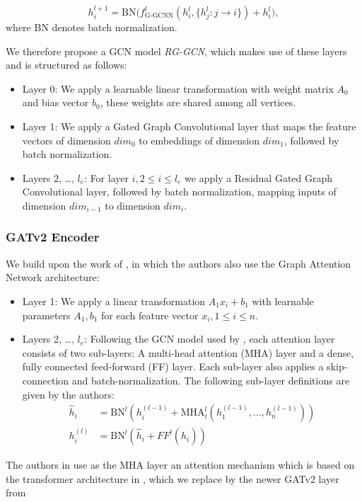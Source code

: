 \documentclass[draft,final]{vutinfth} %
\begin{document}
\[
    h_i^{l+1} = \text{BN} \Big( f_{\text{G-GCNN}}^l(h_i^l, \{ h_j^l \colon j \rightarrow i \}) + h_i^l \Big),
\]
where BN denotes batch normalization. 

We therefore propose a GCN model \textit{RG-GCN}, which makes use of these layers and is structured as follows: 
\begin{itemize}
    \item Layer 0: We apply a learnable linear transformation with weight matrix $A_0$ and bias vector $b_0$, these weights are shared among all vertices. 
    \item Layer 1: We apply a Gated Graph Convolutional layer that maps the feature vectors of dimension $dim_0$ to embeddings of dimension $dim_1$, followed by batch normalization.
    \item Layers 2, \dots, $l_e$: For layer $i, 2 \leq i \leq l_e$ we apply a Residual Gated Graph Convolutional layer, followed by batch normalization, mapping inputs of dimension $dim_{i-1}$ to dimension $dim_i$. 
\end{itemize}

\subsubsection{GATv2 Encoder}
We build upon the work of \cite{Kool2019}, in which the authors also use the Graph Attention Network architecture:
\begin{itemize}
    \item Layer 1: We apply a linear transformation $A_1 x_i + b_1$ with learnable parameters $A_1, b_1$ for each feature vector $x_i, 1 \leq i \leq n$.
    \item Layers 2, \dots, $l_e$: Following the GCN model used by \cite{Kool2019}, each attention layer consists of two sub-layers: A multi-head attention (MHA) layer and a dense, fully connected feed-forward (FF) layer. Each sub-layer also applies a skip-connection and batch-normalization. The following sub-layer definitions are given by the authors: 
    \begin{align*}
        \hat{h}_i &= \text{BN}^l(h_i^{(l-1)} + \text{MHA}_i^l (h_1^{(l-1)}, \dots , h_n^{(l-1)}) ) \\
        h_i^{(l)} &= \text{BN}^l(\hat{h}_i + FF^l(\hat{h}_i))
    \end{align*}
\end{itemize}
The authors in \cite{Kool2019} use as the MHA layer an attention mechanism which is based on the transformer architecture in \cite{VaswaniSPUJGKP17}, which we replace by the newer GATv2 layer from \cite{Brody2021}
\end{document}
